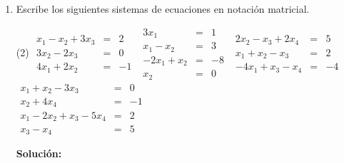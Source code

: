 \documentclass[12pt]{article}
\newenvironment{solucion}
{\begin{mdframed}[backgroundcolor=black!10]
		{\bf Solución:}\\
	}
	{
	\end{mdframed}
}
\newenvironment{preguntas}
{\begin{enumerate}\itemsep12pt
	}
	{
	\end{enumerate}
}
\begin{document}
\begin{preguntas}
\begin{solucion}
\begin{enumerate}[a)]
\item $
			\begin{bmatrix}
			-4 & 2 & 1 &  0\\
			2  & 1 & 2 & -1\\
			-3 & 5 &-6& -2
			\end{bmatrix}
			\Longrightarrow
			\begin{array}{rcr}
			-4x_1 + 2x_2 + x_3& = & 0\\
			2x_1 + x_2 + 2x_3& = & -1\\
			-3x_1 + 5x_2 - 6x_3 & = & -2
			\end{array}
			$
\item $
			\begin{bmatrix}
			2 & 1 & -3 & 0\\
			1  & -2 & 0 & 12\\
			4 & 2 &1& 8
			\end{bmatrix}
			\Longrightarrow
			\begin{array}{rcr}
			2x_1 + x_2 - 3x_3& = & 0\\
			x_1-2x_2& = & 12\\
			4x_1+2x_2+x_3 & = & 8
			\end{array}
			$
\end{enumerate}
\end{solucion}
\item Escribe los siguientes sistemas de ecuaciones en notación matricial.
\begin{tasks}(2)
\task $
		\begin{array}{rcr}
		x_1 -x_2 + 3x_3 & = & 2\\
		3x_2 - 2x_3 & = & 0\\
		4x_1 +2x_2 & = & -1
		\end{array}
		$
\task $
		\begin{array}{rcr}
		3x_1 & = & 1\\
		x_1-x_2& = & 3\\
		-2x_1+x_2 & = & -8\\
		x_2 & = & 0
		\end{array}
		$
\task $
		\begin{array}{rcr}
		2x_2 -x_3 +2x_4& = & 5\\
		x_1+x_2 - x_3 & = & 2\\
		-4x_1 +x_3-x_4& = & -4
		\end{array}
		$
\task $
		\begin{array}{rcr}
		x_1 +x_2-3x_3& = & 0\\
		x_2+4x_4& = & -1\\
		x_1-2x_2+x_3-5x_4 & = & 2\\
		x_3-x_4 & = & 5
		\end{array}
		$
\end{tasks}
\begin{solucion}


\end{solucion}
\end{preguntas}
\end{document}
